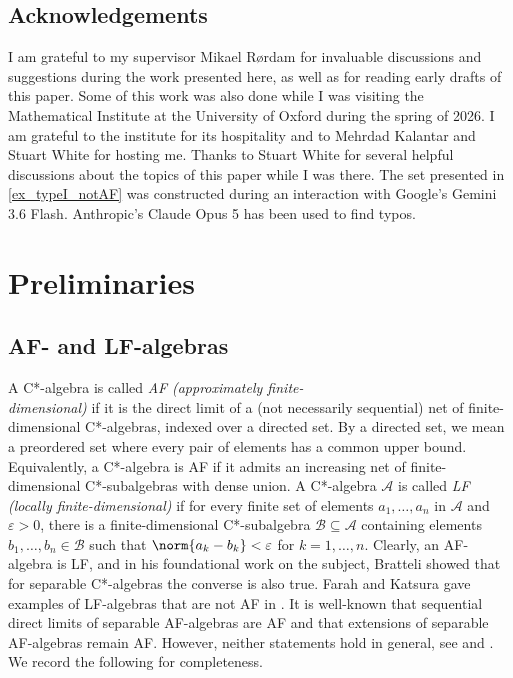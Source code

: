 \documentclass[12pt, a4paper, oneside]{amsart}
\newcommand{\0}{\mathbf{0}}
\newcommand{\1}{\mathbf{1}}
\newcommand{\A}{\mathscr{A}}
\newcommand{\B}{\mathscr{B}}
\begin{document}
	\subsection*{Acknowledgements} I am grateful to my supervisor Mikael Rørdam for invaluable discussions and suggestions during the work presented here, as well as for reading early drafts of this paper. Some of this work was also done while I was visiting the Mathematical Institute at the University of Oxford during the spring of 2026. I am grateful to the institute for its hospitality and to Mehrdad Kalantar and Stuart White for hosting me. Thanks to Stuart White for several helpful discussions about the topics of this paper while I was there. The set presented in \cref{ex_typeI_notAF} was constructed during an interaction with Google's Gemini 3.6 Flash. Anthropic's Claude Opus 5 has been used to find typos. 
	
	\section{Preliminaries} 
	
	\subsection{AF- and LF-algebras}
	\label{subsec_AF}
	
	A C*-algebra is called \textit{AF} \textit{(approximately finite- \\dimensional)} if it is the direct limit of a (not necessarily sequential) net of finite-dimensional C*-algebras, indexed over a directed set. By a directed set, we mean a preordered set where every pair of elements has a common upper bound. Equivalently, a C*-algebra is AF if it admits an increasing net of finite-dimensional C*-subalgebras with dense union. A C*-algebra \(\A\) is called \textit{LF (locally finite-dimensional)} if for every finite set of elements \(a_1, \ldots, a_n\) in \(\A\) and \(\varepsilon > 0\), there is a finite-dimensional C*-subalgebra \(\B \subseteq \A\) containing elements \(b_1, \ldots,  b_n \in \B\) such that \(\norm{a_k-b_k} < \varepsilon\) for \(k = 1, \ldots, n\). Clearly, an AF-algebra is LF, and in his foundational work \cite {bratteli_inductive} on the subject, Bratteli showed that for separable C*-algebras the converse is also true. Farah and Katsura gave examples of LF-algebras that are not AF in \cite{farah}. It is well-known that sequential direct limits of separable AF-algebras are AF and that extensions of separable AF-algebras remain AF. However, neither statements hold in general, see \cite{farah} and \cite{bice2019c}. We record the following for completeness. 
	
\end{document}
